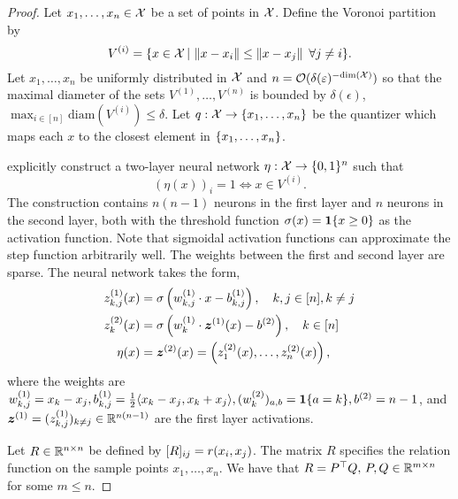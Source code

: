 \begin{proof}
    Let $x_1, \ldots, x_n \in {\mathcal{X}}$ be a set of points in ${\mathcal{X}}$. Define the Voronoi partition by
    \[V^{(i)} = \{x \in {\mathcal{X}} \,|\, \left\lVert x - x_i\right\rVert \leq \left\lVert x - x_j\right\rVert \ \forall j \neq i\}.\]
    Let $x_1, \ldots, x_n$ be uniformly distributed in ${\mathcal{X}}$ and $n = {\mathcal{O}}(\delta(\varepsilon)^{- \mathrm{dim}({\mathcal{X}})})$ so that the maximal diameter of the sets $V^{(1)}, \ldots, V^{(n)}$ is bounded by $\delta(\epsilon)$, $\max_{i \in [n]} \mathrm{diam}(V^{(i)}) \leq \delta$. Let $q: {\mathcal{X}} \to \{x_1, \ldots, x_n\}$ be the quantizer which maps each $x$ to the closest element in $\{x_1, \ldots, x_n\}$.

    \citet{wuExplicitNeuralNetwork2018} explicitly construct a two-layer neural network $\eta:{\mathcal{X}} \to \{0, 1\}^{n}$ such that
    \[{(\eta(x))}_i = 1 \iff x \in V^{(i)}.\]
    The construction contains $n (n - 1)$ neurons in the first layer and $n$ neurons in the second layer, both with the threshold function $\sigma(x) = \bm{1}\{x \geq 0\}$ as the activation function. Note that sigmoidal activation functions can approximate the step function arbitrarily well. The weights between the first and second layer are sparse. The neural network takes the form,
    \begin{equation*}
        \begin{aligned}
            z_{k,j}^{(1)}(x) &= \sigma\paren{w_{k,j}^{(1)} \cdot x - b_{k,j}^{(1)}}, \quad k,j \in [n], k \neq j\\
            z_k^{(2)}(x) &= \sigma\paren{w_k^{(1)} \cdot \bm{z}^{(1)}(x) - b^{(2)}}, \quad k \in [n] \\
            \eta(x) &= \bm{z}^{(2)}(x) = \paren{z_1^{(2)}(x), \ldots, z_n^{(2)}(x)},
        \end{aligned}
    \end{equation*}
    where the weights are $w_{k,j}^{(1)} = x_k - x_j, b_{k,j}^{(1)} = \frac{1}{2} \langle x_k - x_j, x_k + x_j \rangle, (w_{k}^{(2)})_{a,b} = \bm{1}\{a = k\}, b^{(2)} = n - 1$, and $\bm{z}^{(1)} = (z_{k,j}^{(1)})_{k \neq j} \in \mathbb{R}^{n (n - 1)}$ are the first layer activations.

    Let $R \in \mathbb{R}^{n \times n}$ be defined by $[R]_{ij} = r(x_i, x_j)$. The matrix $R$ specifies the relation function on the sample points $x_1, \ldots, x_n$. We have that $R = P^\top Q,\, P,Q \in \mathbb{R}^{m \times n}$ for some $m \leq n$. 


\end{proof}
